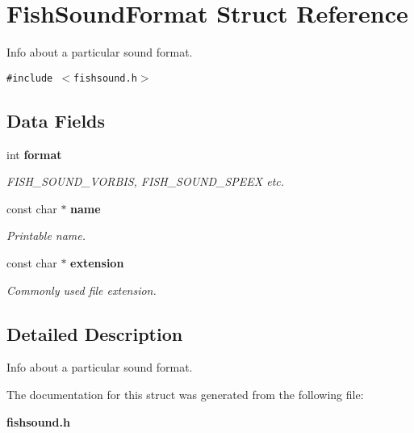 \section{Fish\-Sound\-Format Struct Reference}
\label{structFishSoundFormat}
Info about a particular sound format.  


{\tt \#include $<$fishsound.h$>$}

\subsection*{Data Fields}
\begin{CompactItemize}
\item 
int {\bf format}\label{structFishSoundFormat_o0}

\begin{CompactList}\small\item\em FISH\_\-SOUND\_\-VORBIS, FISH\_\-SOUND\_\-SPEEX etc. \item\end{CompactList}\item 
const char $\ast$ {\bf name}\label{structFishSoundFormat_o1}

\begin{CompactList}\small\item\em Printable name. \item\end{CompactList}\item 
const char $\ast$ {\bf extension}\label{structFishSoundFormat_o2}

\begin{CompactList}\small\item\em Commonly used file extension. \item\end{CompactList}\end{CompactItemize}


\subsection{Detailed Description}
Info about a particular sound format. 



The documentation for this struct was generated from the following file:\begin{CompactItemize}
\item 
{\bf fishsound.h}\end{CompactItemize}
